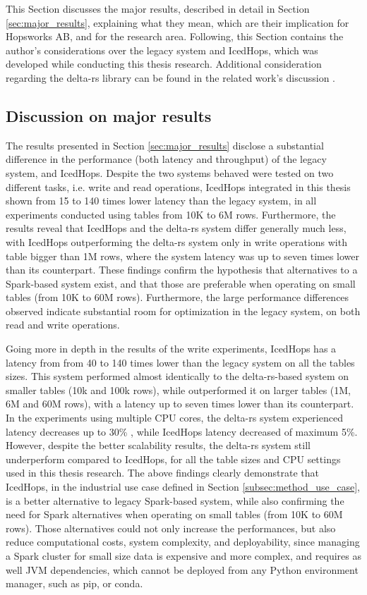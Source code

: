 This Section discusses the major results, described in detail in Section \ref{sec:major_results}, explaining what they mean, which are their implication for Hopsworks AB, and for the research area. Following, this Section contains the author's considerations over the legacy system and IcedHops, which was developed while conducting this thesis research. Additional consideration regarding the delta-rs library can be found in the related work's discussion \cite{manfrediReducingReadWrite2024}.



\subsection{Discussion on major results}
The results presented in Section \ref{sec:major_results} disclose a substantial difference in the performance (both latency and throughput) of the legacy system, and IcedHops. Despite the two systems behaved were tested on two different tasks, i.e. write and read operations, IcedHops integrated in this thesis shown from 15 to 140 times lower latency than the legacy system, in all experiments conducted using tables from 10K to 6M rows. Furthermore, the results reveal that IcedHops and the delta-rs system differ generally much less, with IcedHops outperforming the delta-rs system only in write operations with table bigger than 1M rows, where the system latency was up to seven times lower than its counterpart. These findings confirm the hypothesis that alternatives to a Spark-based system exist, and that those are preferable when operating on small tables (from 10K to 60M rows). Furthermore, the large performance differences observed indicate substantial room for optimization in the legacy system, on both read and write operations.

Going more in depth in the results of the write experiments, IcedHops has a latency from from 40 to 140 times lower than the legacy system on all the tables sizes. This system performed almost identically to the delta-rs-based system on smaller tables (10k and 100k rows), while outperformed it on larger tables (1M, 6M and 60M rows), with a latency up to seven times lower than its counterpart. In the experiments using multiple \gls{CPU} cores, the delta-rs system experienced latency decreases up to 30\% , while IcedHops latency decreased of maximum 5\%. However, despite the better scalability results, the delta-rs system still underperform compared to IcedHops, for all the table sizes and \gls{CPU} settings used in this thesis research. The above findings clearly demonstrate that IcedHops, in the industrial use case defined in Section \ref{subsec:method_use_case}, is a better alternative to legacy Spark-based system, while also confirming the need for Spark alternatives when operating on small tables (from 10K to 60M rows). Those alternatives could not only increase the performances, but also reduce computational costs, system complexity, and deployability, since managing a Spark cluster for small size data is expensive and more complex, and requires as well \gls{JVM} dependencies, which cannot be deployed from any Python environment manager, such as pip, or conda.

